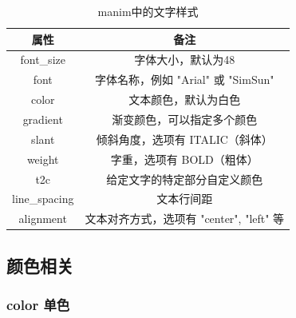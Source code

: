 \begin{table}[htpb]
\begin{tabular}{c|c}
属性              & 备注                                \\ \hline
font\_size        & 字体大小，默认为48                   \\
font              & 字体名称，例如 "Arial" 或 "SimSun"    \\
color             & 文本颜色，默认为白色                 \\
gradient          & 渐变颜色，可以指定多个颜色            \\
slant             & 倾斜角度，选项有 ITALIC（斜体）         \\
weight            & 字重，选项有 BOLD（粗体）             \\
t2c               & 给定文字的特定部分自定义颜色         \\
line\_spacing     & 文本行间距                          \\
alignment         & 文本对齐方式，选项有 "center", "left" 等 \\
\end{tabular}
\caption{manim中的文字样式}
\label{tab:manim中的文字样式}
\end{table}

\subsection{颜色相关}
\label{subsec:manim_text_formula_style_color}
\subsubsection{color 单色}
\label{subsubsec:manim_text_formula_style_color_single}

